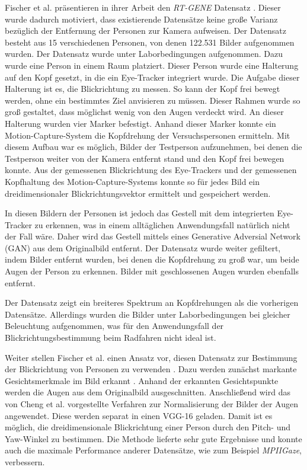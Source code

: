 Fischer et al. präsentieren in ihrer Arbeit den \textit{RT-GENE} Datensatz \cite{paper:rt_gene}. Dieser wurde dadurch motiviert, dass existierende Datensätze keine große Varianz bezüglich der Entfernung der Personen zur Kamera aufweisen. Der Datensatz besteht aus 15 verschiedenen Personen, von denen 122.531 Bilder aufgenommen wurden. Der Datensatz wurde unter Laborbedingungen aufgenommen. Dazu wurde eine Person in einem Raum platziert. Dieser Person wurde eine Halterung auf den Kopf gesetzt, in die ein Eye-Tracker integriert wurde. Die Aufgabe dieser Halterung ist es, die Blickrichtung zu messen. So kann der Kopf frei bewegt werden, ohne ein bestimmtes Ziel anvisieren zu müssen. Dieser Rahmen wurde so groß gestaltet, dass möglichst wenig von den Augen verdeckt wird. An dieser Halterung wurden vier Marker befestigt. Anhand dieser Marker konnte ein Motion-Capture-System die Kopfdrehung der Versuchspersonen ermitteln. Mit diesem Aufbau war es möglich, Bilder der Testperson aufzunehmen, bei denen die Testperson weiter von der Kamera entfernt stand und den Kopf frei bewegen konnte. Aus der gemessenen Blickrichtung des Eye-Trackers und der gemessenen Kopfhaltung des Motion-Capture-Systems konnte so für jedes Bild ein dreidimensionaler Blickrichtungsvektor ermittelt und gespeichert werden.

In diesen Bildern der Personen ist jedoch das Gestell mit dem integrierten Eye-Tracker zu erkennen, was in einem alltäglichen Anwendungsfall natürlich nicht der Fall wäre. Daher wird das Gestell mittels eines Generative Adversial Network (GAN) \cite{paper:gan} aus dem Originalbild entfernt. Der Datensatz wurde weiter gefiltert, indem Bilder entfernt wurden, bei denen die Kopfdrehung zu groß war, um beide Augen der Person zu erkennen. Bilder mit geschlossenen Augen wurden ebenfalls entfernt.

Der Datensatz zeigt ein breiteres Spektrum an Kopfdrehungen als die vorherigen Datensätze. Allerdings wurden die Bilder unter Laborbedingungen bei gleicher Beleuchtung aufgenommen, was für den Anwendungsfall der Blickrichtungsbestimmung beim Radfahren nicht ideal ist. 

Weiter stellen Fischer et al. einen Ansatz vor, diesen Datensatz zur Bestimmung der Blickrichtung von Personen zu verwenden \cite{paper:rt_gene}. Dazu werden zunächst markante Gesichtsmerkmale im Bild erkannt \cite{paper:mtcnn}. Anhand der erkannten Gesichtspunkte werden die Augen aus dem Originalbild ausgeschnitten. Anschließend wird das von Cheng et al. vorgestellte Verfahren zur Normalisierung der Bilder der Augen \cite{paper:basics:survey} angewendet. Diese werden separat in einen VGG-16 \cnn geladen. Damit ist es möglich, die dreidimensionale Blickrichtung einer Person durch den Pitch- und Yaw-Winkel zu bestimmen. Die Methode lieferte sehr gute Ergebnisse und konnte auch die maximale Performance anderer Datensätze, wie zum Beispiel \textit{MPIIGaze}, verbessern.

